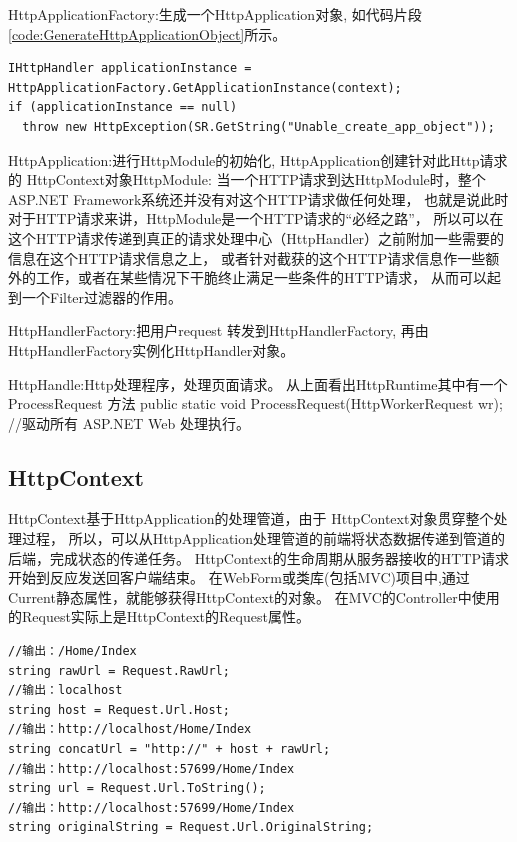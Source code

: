\documentclass{book}
\begin{document}
HttpApplicationFactory:生成一个HttpApplication对象,
如代码片段\ref{code:GenerateHttpApplicationObject}所示。

\begin{lstlisting}[language={[Sharp]C},caption=生成HttpApplication,label={code:GenerateHttpApplicationObject}]
IHttpHandler applicationInstance = HttpApplicationFactory.GetApplicationInstance(context);
if (applicationInstance == null)
  throw new HttpException(SR.GetString("Unable_create_app_object"));
\end{lstlisting}

HttpApplication:进行HttpModule的初始化,
HttpApplication创建针对此Http请求的 HttpContext对象HttpModule: 
当一个HTTP请求到达HttpModule时，整个ASP.NET Framework系统还并没有对这个HTTP请求做任何处理，
也就是说此时对于HTTP请求来讲，HttpModule是一个HTTP请求的“必经之路”，
所以可以在这个HTTP请求传递到真正的请求处理中心（HttpHandler）之前附加一些需要的信息在这个HTTP请求信息之上，
或者针对截获的这个HTTP请求信息作一些额外的工作，或者在某些情况下干脆终止满足一些条件的HTTP请求，
从而可以起到一个Filter过滤器的作用。

HttpHandlerFactory:把用户request 转发到HttpHandlerFactory,
再由HttpHandlerFactory实例化HttpHandler对象。

HttpHandle:Http处理程序，处理页面请求。
从上面看出HttpRuntime其中有一个ProcessRequest 方法
public static void ProcessRequest(HttpWorkerRequest wr);  //驱动所有 ASP.NET Web 处理执行。

\subsection{HttpContext}

HttpContext基于HttpApplication的处理管道，由于 HttpContext对象贯穿整个处理过程，
所以，可以从HttpApplication处理管道的前端将状态数据传递到管道的后端，完成状态的传递任务。
HttpContext的生命周期从服务器接收的HTTP请求开始到反应发送回客户端结束。
在WebForm或类库(包括MVC)项目中,通过Current静态属性，就能够获得HttpContext的对象。
在MVC的Controller中使用的Request实际上是HttpContext的Request属性。

\begin{lstlisting}[language={[Sharp]C}]
//输出：/Home/Index
string rawUrl = Request.RawUrl;
//输出：localhost
string host = Request.Url.Host;
//输出：http://localhost/Home/Index
string concatUrl = "http://" + host + rawUrl;
//输出：http://localhost:57699/Home/Index
string url = Request.Url.ToString();
//输出：http://localhost:57699/Home/Index
string originalString = Request.Url.OriginalString;
\end{lstlisting}
\end{document}
